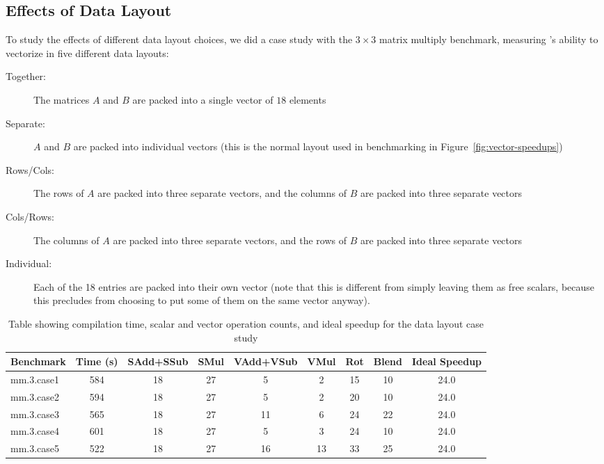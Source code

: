 \subsection{Effects of Data Layout}\label{sec:effects-of-data-layout}
To study the effects of different data layout choices, we did a case study with the $3\times 3$ matrix multiply benchmark, measuring \system's ability to vectorize in five different data layouts:
\begin{description}
    \item[Together:] The matrices $A$ and $B$ are packed into a single vector of $18$ elements
    \item[Separate:] $A$ and $B$ are packed into individual vectors (this is the normal layout used in benchmarking in Figure~\ref{fig:vector-speedups})
    \item[Rows/Cols:] The rows of $A$ are packed into three separate vectors, and the columns of $B$ are packed into three separate vectors
    \item[Cols/Rows:] The columns of $A$ are packed into three separate vectors, and the rows of $B$ are packed into three separate vectors
    \item[Individual:] Each of the 18 entries are packed into their own vector (note that this is different from simply leaving them as free scalars, because this precludes \system from choosing to put some of them on the same vector anyway).     
\end{description}
\begin{table}
    \tiny
    \caption{Table showing compilation time, scalar and vector operation counts, and ideal speedup for the data layout case study}\label{tab:bigass-data-layout}
    \begin{tabular}{lcccccccc}
    \toprule
    Benchmark & Time (s) & SAdd+SSub & SMul & VAdd+VSub & VMul & Rot & Blend & Ideal Speedup\\\midrule
    mm.3.case1 & 584 & 18 & 27 & 5 & 2 & 15 & 10 & 24.0\\
    mm.3.case2 & 594 & 18 & 27 & 5 & 2 & 20 & 10 & 24.0\\
    mm.3.case3 & 565 & 18 & 27 & 11 & 6 & 24 & 22 & 24.0\\
    mm.3.case4 & 601 & 18 & 27 & 5 & 3 & 24 & 10 & 24.0\\
    mm.3.case5 & 522 & 18 & 27 & 16 & 13 & 33 & 25 & 24.0\\\bottomrule
    \end{tabular}
\end{table}
